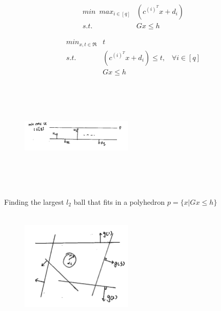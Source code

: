 \begin{example}
	\begin{align*}
	min \,\,\, max_{i\in [q]} &(c^{(i)^T}x + d_i)\\
	s.t. &Gx\leq h
	\end{align*}
	
	\begin{align*}
	min_{x, t\in \Re} &t\\
	s.t. &(c^{(i)^T}x + d_i)\leq t,\,\,\,\,\, \forall i\in [q]\\
	&Gx\leq h
	\end{align*}
	
	\begin{figure}
	\centering
	\includegraphics[width=2.1in,height=2.1in]{figures/ch07/figure1016_5.png}
	\end{figure}
\end{example}



\begin{example}
	Finding the largest $l_2$ ball that fits in a polyhedron $p = \{x| Gx\leq h \}$
	
	\begin{figure}
	\centering
	\includegraphics[width=2.1in,height=2.1in]{figures/ch07/figure1016_6.png}
	\end{figure}
\end{example}

